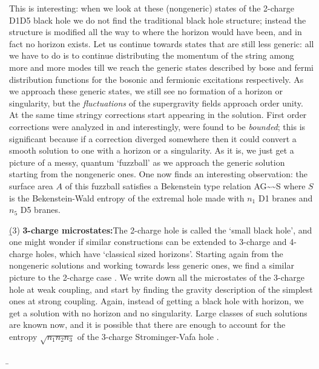 \documentclass[12pt]{article}
\begin{document}
This is interesting: when we look at these (nongeneric) states of the 2-charge D1D5 black hole we do not find the traditional black hole structure; instead the structure is modified all the way to where the horizon would have been, and in fact no horizon exists. Let us continue towards states that are still less generic: all we have to do is to continue distributing the momentum of the string among more and more modes till we reach the generic states described by bose and fermi distribution functions for the bosonic and fermionic excitations respectively. As we approach these generic states, we still see no formation of a horizon or singularity, but the {\it fluctuations} of the supergravity fields approach order unity. At the same time stringy corrections start appearing in the solution. First order corrections were analyzed in \cite{higher,phase} and interestingly, were found to be {\it bounded}; this is significant because if a correction diverged somewhere then it could convert a smooth solution to one with a horizon or a singularity. As it is, we just get a picture of a messy, quantum `fuzzball' as we approach the generic solution starting from the nongeneric ones. One now finds an interesting observation:  the surface area $A$ of this fuzzball satisfies a Bekenstein type relation \cite{lm5}
\be
{A\over G}\sim  {}\sim S
\ee
where $S$ is the Bekenstein-Wald entropy of the  extremal hole made with $n_1$ D1 branes and $n_5$ D5 branes.

\b

(3) {\bf 3-charge microstates:}\quad The 2-charge hole is called the `small black hole', and one might wonder if similar constructions can be extended to 3-charge and 4-charge holes, which have `classical sized horizons'. Starting again from the nongeneric solutions and working towards less generic ones, we find a similar picture to the 2-charge case \cite{3charge, 3chargeother}. We write down all the microstates of the 3-charge hole at weak coupling, and start by finding the gravity description of the simplest ones at strong coupling.  Again, instead of getting a black hole with horizon, we get a solution with no horizon and no singularity. Large classes of such solutions are known now, and it is possible that there are enough to account for the entropy $\sqrt{n_1n_2n_3}$ of the 3-charge Strominger-Vafa hole \cite{bena}.

\b
\end{document}
